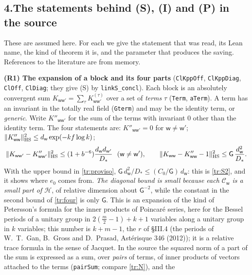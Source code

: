 \documentclass[11pt,letterpaper]{article}
\begin{document}
\subsection*{4.\quad The statements behind \textup{(S)}, \textup{(I)} and \textup{(P)} in the source}

These are assumed here. For each we give the statement that was read, its Lean name, the kind of theorem it
is, and the parameter that produces the saving. References to the literature are from memory.

\textbf{(R1) The expansion of a block and its four parts} (\texttt{ClKppOff}, \texttt{ClKppDiag}, \texttt{ClOff},
\texttt{ClDiag}; they give (S) by \texttt{linkS\_concl}). Each block is an absolutely convergent sum
$K_{\mathsf w\mathsf w'}=\sum_\tau K^{(\tau)}_{\mathsf w\mathsf w'}$ over a set of \emph{terms} $\tau$ (\texttt{Term}, \texttt{aTerm}). A term has an
invariant in the totally real field (\texttt{Gterm}) and may be the identity term, or \emph{generic}. Write
$K''_{\mathsf w\mathsf w'}$ for the sum of the terms with invariant $0$ other than the identity term. The four
statements are: $K''_{\mathsf w\mathsf w'}=0$ for $\mathsf w\ne\mathsf w'$;
$\|K''_{\mathsf w\mathsf w}\|_{\rm HS}^2\le d_{\mathsf w}\exp(-kf\log k)$;
\begin{equation}\label{tr:four}
 \|K_{\mathsf w\mathsf w'}-K''_{\mathsf w\mathsf w'}\|_{\rm HS}^2\le(1+b^{-6})\frac{d_{\mathsf w}d_{\mathsf w'}}{D_*}\ \ (\mathsf w\ne\mathsf w'),
 \qquad
 \|K_{\mathsf w\mathsf w}-K''_{\mathsf w\mathsf w}-1\|_{\rm HS}^2\le\mathsf G\,\frac{d_{\mathsf w}^2}{D_*}.
\end{equation}
With the upper bound in \eqref{tr:proviso}, $\mathsf G\,d_{\mathsf w}^2/D_*\le(C_0/\mathsf G)\,d_{\mathsf w}$: this is
\eqref{tr:S2}, and it shows where $e_0$ comes from. \emph{The diagonal bound is small because each
$\mathcal C_{\mathsf w}$ is a small part of $\mathcal H$}, of relative dimension about $\mathsf G^{-2}$, while
the constant in the second bound of \eqref{tr:four} is only $\mathsf G$. This is an expansion of the kind of
Petersson's formula for the inner products of Poincar\'e series, here for the Bessel periods of a unitary
group in $2(\frac m2-1)+k+1$ variables along a unitary group in $k$ variables; this number is $k+m-1$, the $r$ of \S III.4 (the periods of W.~T.~Gan,
B.~Gross and D.~Prasad, Ast\'erisque 346 (2012)); it is a relative trace formula in the sense of Jacquet. In
the source the squared norm of a part of the sum is expressed as a sum, over \emph{pairs} of terms, of inner
products of vectors attached to the terms (\texttt{pairSum}; compare \eqref{tr:N}), and the
\end{document}
